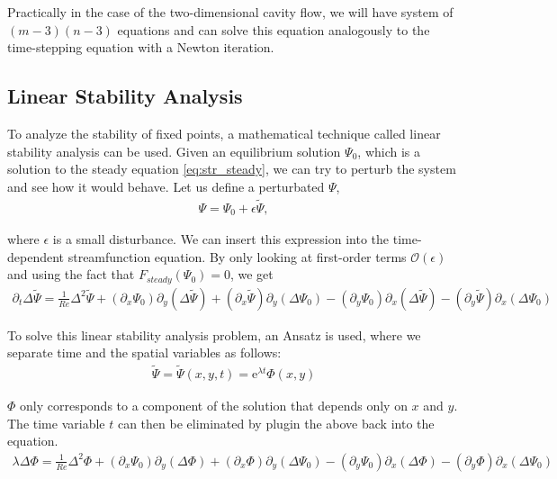 Practically in the case of the two-dimensional cavity flow, we will have system
of $(m-3)(n-3)$ equations and can solve this equation analogously to the
time-stepping equation with a Newton iteration.

\subsection{Linear Stability Analysis}

To analyze the stability of fixed points, a mathematical technique called
linear stability analysis can be used. Given an equilibrium solution $\Psi_0$,
which is a solution to the steady equation \eqref{eq:str_steady}, we can try to
perturb the system and see how it would behave. Let us define a perturbated
$\Psi$,
\begin{align}
\Psi = \Psi_0 + \epsilon \tilde{\Psi},
\end{align}

where $\epsilon$ is a small disturbance. We can insert this expression into the
time-dependent streamfunction equation. By only looking at first-order terms
$\mathcal{O}(\epsilon)$ and using the fact that $F_{steady}(\Psi_0) = 0$, we
get
\begin{align}
\partial_t \Delta \tilde{\Psi} = \frac{1}{Re} \Delta^2 \tilde{\Psi}
  + (\partial_x \Psi_0) \partial_y (\Delta \tilde{\Psi})
  + (\partial_x \tilde{\Psi}) \partial_y (\Delta \Psi_0)
  - (\partial_y \Psi_0) \partial_x (\Delta \tilde{\Psi})
  - (\partial_y \tilde{\Psi}) \partial_x (\Delta \Psi_0)
\label{eq:str_pert}
\end{align}

To solve this linear stability analysis problem, an Ansatz is used, where we
separate time and the spatial variables as follows: 
\begin{align}
  \tilde{\Psi} = \tilde{\Psi}(x,y,t) = \mathrm{e}^{\lambda t} \Phi(x,y)
\end{align}

$\Phi$ only corresponds to a component of the solution that depends only on $x$
and $y$. The time variable $t$ can then be eliminated by plugin the above back
into the equation.
\begin{align}
\lambda \Delta \Phi = \frac{1}{Re} \Delta^2 \Phi
  + (\partial_x \Psi_0) \partial_y (\Delta \Phi)
  + (\partial_x \Phi) \partial_y (\Delta \Psi_0)
  - (\partial_y \Psi_0) \partial_x (\Delta \Phi)
  - (\partial_y \Phi) \partial_x (\Delta \Psi_0)
\label{eq:str_phi}
\end{align}


